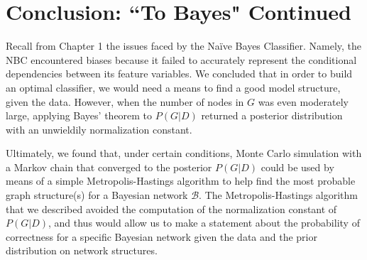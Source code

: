 \documentclass[12pt,twoside]{reedthesis}
\begin{document}
		\section{Conclusion: ``To Bayes" Continued}
			Recall from Chapter 1 the issues faced by the Na\"{i}ve Bayes Classifier. Namely, the NBC encountered biases because it failed to accurately represent the conditional dependencies between its feature variables. 
			We concluded that in order to build an optimal classifier, we would need a means to find a good model structure, given the data. 
			However, when the number of nodes in $G$ was even moderately large, applying Bayes' theorem to $P(G | D)$ returned a posterior distribution with an unwieldily normalization constant. 
			
			Ultimately, we found that, under certain conditions, Monte Carlo simulation with a Markov chain that converged to the posterior $P(G | D)$ could be used by means of a simple Metropolis-Hastings algorithm to help find the most probable graph structure(s) for a Bayesian network $\mathcal{B}$. 
			The Metropolis-Hastings algorithm that we described avoided the computation of the normalization constant of $P(G | D)$, and thus would allow us to make a statement about the probability of correctness for a specific Bayesian network given the data and the prior distribution on network structures.
			
			
			
									
\end{document}
